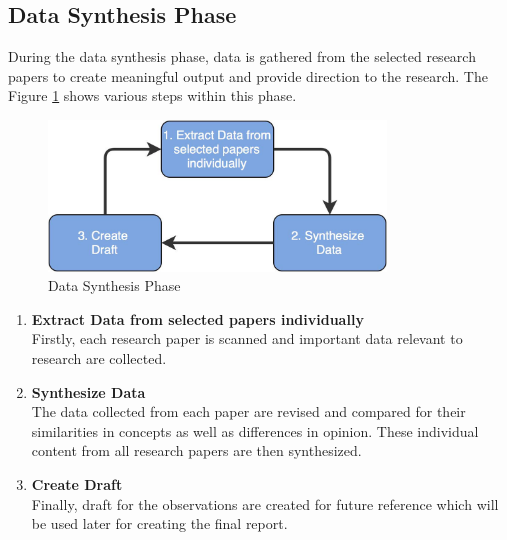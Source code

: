 \subsection{Data Synthesis Phase}\label{section:context/approach/data_synthesis_phase}
During the data synthesis phase, data is gathered from the selected research papers to create meaningful output and provide direction to the research. The Figure \ref{fig:context/data_synthesis_phase} shows various steps within this phase.

\begin{figure}[H]
\begin{center}
\includegraphics[width=0.8\textwidth]{figures/introduction_data_synthesis_phase}
\caption{Data Synthesis Phase}
\label{fig:context/data_synthesis_phase}
\end{center}
\end{figure}

\begin{enumerate}
\item \textbf{Extract Data from selected papers individually}\\
Firstly, each research paper is scanned and important data relevant to research are collected.
\item \textbf{Synthesize Data}\\
The data collected from each paper are revised and compared for their similarities in concepts as well as differences in opinion. These individual content from all research papers are then synthesized.
\item \textbf{Create Draft}\\
Finally, draft for the observations are created for future reference which will be used later for creating the final report.
\end{enumerate}


